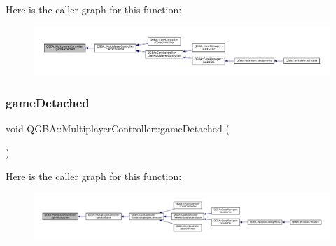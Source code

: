 Here is the caller graph for this function\+:
\nopagebreak
\begin{figure}[H]
\begin{center}
\leavevmode
\includegraphics[width=350pt]{class_q_g_b_a_1_1_multiplayer_controller_ab2affa28eb8bec202428b5ccb7240e93_icgraph}
\end{center}
\end{figure}
\mbox{\label{class_q_g_b_a_1_1_multiplayer_controller_a9b536ffaf180c76b90350929d9daa4e7}} 
\subsubsection{\texorpdfstring{game\+Detached}{gameDetached}}
{\footnotesize\ttfamily void Q\+G\+B\+A\+::\+Multiplayer\+Controller\+::game\+Detached (\begin{DoxyParamCaption}{ }\end{DoxyParamCaption})\hspace{0.3cm}{\ttfamily [signal]}}

Here is the caller graph for this function\+:
\nopagebreak
\begin{figure}[H]
\begin{center}
\leavevmode
\includegraphics[width=350pt]{class_q_g_b_a_1_1_multiplayer_controller_a9b536ffaf180c76b90350929d9daa4e7_icgraph}
\end{center}
\end{figure}
\mbox{\label{class_q_g_b_a_1_1_multiplayer_controller_a026387b700c0e6935190107434fbe103}} 
